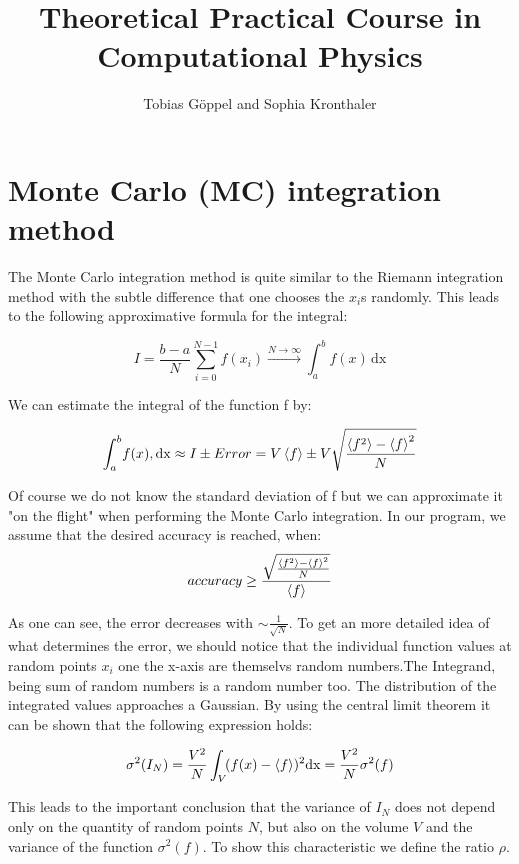 \documentclass[12pt,a4paper,titlepage]{article}
\author{Tobias G\"oppel and Sophia Kronthaler}
\title{Theoretical Practical Course in Computational Physics}
\begin{document}
\maketitle

\newpage
\tableofcontents
\newpage


\section{Monte Carlo (MC) integration method} 

The Monte Carlo integration method is quite similar to the Riemann integration method with the subtle difference that one chooses the $x_i$s randomly. This leads to the following approximative formula for the integral:

\begin{equation}
I = \frac{b-a}{N} \sum_{i=0}^{N-1} f(x_i) \xrightarrow{N\rightarrow \infty} \int_a^b\! f(x)\, \mathrm{dx}
\end{equation}
												

We can estimate the integral of the function f by:

\begin{equation}
\int_a^b\! f(x),\mathrm{dx} \approx I \pm Error = V \braket{f} \pm V \sqrt{\frac{\braket{f^2}-\braket{f}^2}{N}} 
\end{equation}

Of course we do not know the standard deviation of f but we can approximate it "on the flight" when performing the Monte Carlo integration. In our program, we assume that the desired accuracy is
reached, when:
\[accuracy \geq \frac{\sqrt{\frac{\braket{f^2}-\braket{f}^2}{N}}}{\braket{f}} \]


As one can see, the error decreases with $\sim \frac{1}{\sqrt{N}}$.
To get an more detailed idea of what determines the error, we should notice that the individual function values at random points $x_i$ one the x-axis are themselvs random numbers.The Integrand, being sum of random numbers is a random number too. The distribution of the integrated values approaches a Gaussian. By using the central limit theorem it can be shown that the following expression holds:

\begin{equation}
\sigma^2(I_N) = \frac{V^2}{N} \int_V \!(f(x) - \braket{f})^2 \mathrm{dx}=\frac{V^2}{N}\sigma^2(f)
\end{equation}

This leads to the important conclusion that the variance of $I_N$ does not depend only on the quantity of random points $N$, but also on the volume $V$ and the variance of the function $\sigma^2(f)$.
To show this characteristic we define the ratio $\rho$.
\end{document}

